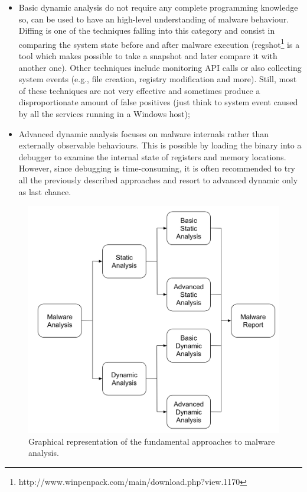 \documentclass[LaM,binding=0.6cm]{sapthesis}
\begin{document}
\begin{itemize}
\begin{itemize}
\item Basic dynamic analysis do not require any complete programming knowledge so, can be used to have an high-level understanding of malware behaviour. Diffing is one of the techniques falling into this category and consist in comparing the system state before and after malware execution (regshot\footnote{http://www.winpenpack.com/main/download.php?view.1170} is a tool which makes possible to take a snapshot and later compare it with another one). Other techniques include monitoring API calls or also collecting system events (e.g., file creation, registry modification and more). Still, most of these techniques are not very effective and sometimes produce a disproportionate amount of false positives (just think to system event caused by all the services running in a Windows host);
\item Advanced dynamic analysis focuses on malware internals rather than externally observable behaviours. This is possible by loading the binary into a debugger to examine the internal state of registers and memory locations. However, since debugging is time-consuming, it is often recommended to try all the previously described approaches and resort to advanced dynamic only as last chance.
\end{itemize}
\end{itemize}

\begin{figure}[h!]
\centering
\includegraphics[scale=.5]{images/background3}
\caption{Graphical representation of the fundamental approaches to malware analysis.}
\end{figure}
\end{document}
